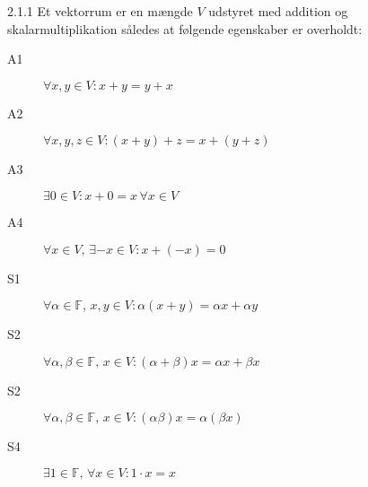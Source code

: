 \begin{definition}{2.1.1}
Et vektorrum er en mængde $V$ udstyret med addition og skalarmultiplikation
således at følgende egenskaber er overholdt:

	\begin{description}
		\item[A1] $\forall x,y \in V \colon x+y=y+x$
		\item[A2] $\forall x,y,z \in V \colon (x+y)+z=x+(y+z)$
		\item[A3] $\exists 0 \in V \colon x+0=x \, \forall x \in V$
		\item[A4] $\forall x \in V, \, \exists -x \in V \colon x+(-x)=0$
		\item[S1] $\forall \alpha \in \mathbb{F}, \, x,y \in V \colon
			\alpha (x+y)=\alpha x+ \alpha y$
		\item[S2] $\forall \alpha, \beta \in \mathbb{F}, \, x \in V \colon
			(\alpha + \beta)x=\alpha x + \beta x$
		\item[S2] $\forall \alpha, \beta \in \mathbb{F}, \, x \in V \colon
			(\alpha\beta)x=\alpha (\beta x)$
		\item[S4] $\exists 1 \in \mathbb{F}, \, \forall x \in V \colon 1 \cdot x=x$
	\end{description}
\end{definition}
